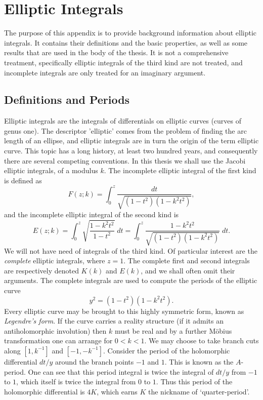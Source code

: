 
\chapter{Elliptic Integrals}
\label{chp:Elliptic Integrals}

The purpose of this appendix is to provide background information about elliptic integrals. It contains their definitions and the basic properties, as well as some results that are used in the body of the thesis. It is not a comprehensive treatment, specifically elliptic integrals of the third kind are not treated, and incomplete integrals are only treated for an imaginary argument.

\section{Definitions and Periods}
Elliptic integrals are the integrals of differentials on elliptic curves (curves of genus one). The descriptor 'elliptic' comes from the problem of finding the arc length of an ellipse, and elliptic integrals are in turn the origin of the term elliptic curve. This topic has a long history, at least two hundred years, and consequently there are several competing conventions. In this thesis we shall use the Jacobi elliptic integrals, of a modulus $k$. The incomplete elliptic integral of the first kind is defined as
\[
F(z;k) = \int_0^z \frac{dt}{\sqrt{(1-t^2)(1-k^2 t^2)}},
\]
and the incomplete elliptic integral of the second kind is
\[
E(z;k) = \int_0^z \sqrt{\frac{1-k^2 t^2}{1-t^2}} \;dt = \int_0^z \frac{1-k^2 t^2}{\sqrt{(1-t^2)(1-k^2 t^2)}}\;dt.
\]
We will not have need of integrals of the third kind. Of particular interest are the \emph{complete} elliptic integrals, where $z=1$. The complete first and second integrals are respectively denoted $K(k)$ and $E(k)$, and we shall often omit their arguments. The complete integrals are used to compute the periods of the elliptic curve
\[
y^2 = (1-t^2)(1-k^2 t^2).
\]
Every elliptic curve may be brought to this highly symmetric form, known as {\it Legendre's form}. If the curve carries a reality structure (if it admits an antiholomorphic involution) then $k$ must be real and by a further M\"obius transformation one can arrange for $0 < k < 1$. We may choose to take branch cuts along $[1,k^{-1}]$ and $[-1,-k^{-1}]$. Consider the period of the holomorphic differential $dt / y $ around the branch points $-1$ and $1$. This is known as the $A$-period. One can see that this period integral is twice the integral of $dt/ y$ from $-1$ to $1$, which itself is twice the integral from $0$ to $1$. Thus this period of the holomorphic differential is $4K$, which earns $K$ the nickname of `quarter-period'.

